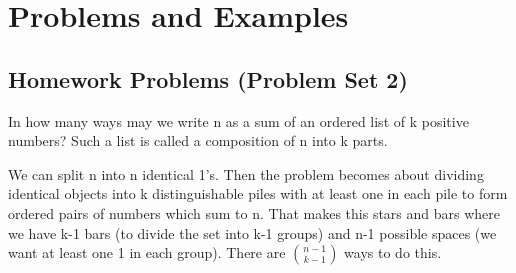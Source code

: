 \label{11-0226-2}

% 






% 



\noindent


\section{Problems and Examples}



\subsection{Homework Problems (Problem Set 2)}

\begin{problem}{1}
    In how many ways may we write n as a sum of an ordered list of k positive numbers? Such a list is called a composition of n into k parts.
\end{problem}
\begin{solution}
    We can split n into n identical 1's. Then the problem becomes about dividing identical objects into k distinguishable piles with at least one in each pile to form ordered pairs of numbers which sum to n. That makes this stars and bars where we have k-1 bars (to divide the set into k-1 groups) and n-1 possible spaces (we want at least one 1 in each group). There are $\binom{n-1}{k-1}$ ways to do this.
\end{solution}


